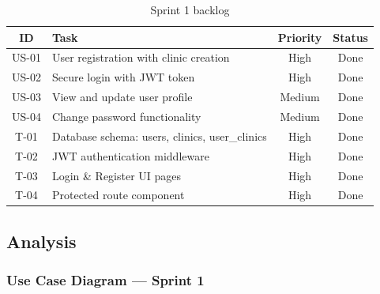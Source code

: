 \documentclass[12pt,a4paper,oneside]{report}
\begin{document}
\begin{table}[H]
\centering
\caption{Sprint 1 backlog}
\label{tab:sprint1_backlog}
\begin{tabular}{|c|p{7cm}|c|c|}
\hline
\textbf{ID} & \textbf{Task} & \textbf{Priority} & \textbf{Status} \\
\hline
US-01 & User registration with clinic creation & High & Done \\
\hline
US-02 & Secure login with JWT token & High & Done \\
\hline
US-03 & View and update user profile & Medium & Done \\
\hline
US-04 & Change password functionality & Medium & Done \\
\hline
T-01 & Database schema: users, clinics, user\_clinics & High & Done \\
\hline
T-02 & JWT authentication middleware & High & Done \\
\hline
T-03 & Login \& Register UI pages & High & Done \\
\hline
T-04 & Protected route component & High & Done \\
\hline
\end{tabular}
\end{table}

\subsection{Analysis}

\subsubsection{Use Case Diagram — Sprint 1}
\end{document}
